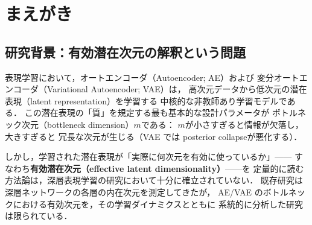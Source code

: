 \documentclass[11pt,a4paper]{jsarticle}
\newcommand{\mknee}{m^{\mathrm{knee}}}
\begin{document}
\begin{abstract}
\begin{enumerate}
        CIFAR-10 での拡張スイープ（実験 Exp-NatImg-Sweep，§\ref{sec:exp_natimg_sweep}）により，
        $m \in [32, 1024]$・$\beta_{\max} \in \{10,20,40,80\}$・デコーダ容量3水準で系統的に検索した結果，
        $\beta_{\max}=80$（薄型デコーダ）において$m=512$付近で AU 飽和プラトーの初観測に成功した
        （安定同定ではないが自然画像での飽和実現の最初の証拠）．
        また自然画像で「stable identification とみなせる条件」を5項目の判定基準として明文化し（§\ref{sec:natimg_stable_id}），
        $\mknee$検出法の比較実験（実験 Exp-NatImg-Knee，§\ref{sec:exp_natimg_knee}）により
        自然画像での最適検出法を特定した．
\end{enumerate}

本論文の方法論的貢献は，「各指標が何に対して頑健で，何に対して探索的か」を
実証的かつ理論的に明確化した点にあり，AE/VAE の設計・診断のための
実用的な多指標解釈ガイドラインを確立する．
\end{abstract}

\section{まえがき}\label{sec:intro}

\subsection{研究背景：有効潜在次元の解釈という問題}\label{sec:intro_bg}

表現学習において，オートエンコーダ（Autoencoder; AE）および
変分オートエンコーダ（Variational Autoencoder; VAE）\cite{kingma2014vae}は，
高次元データから低次元の潜在表現（latent representation）を学習する
中核的な非教師あり学習モデルである\cite{bengio2013representation}．
この潜在表現の「質」を規定する最も基本的な設計パラメータが
ボトルネック次元（bottleneck dimension）$m$である：
$m$が小さすぎると情報が欠落し，大きすぎると
冗長な次元が生じる（VAE では posterior collapse\cite{lucas2019elbo}が悪化する）．

しかし，学習された潜在表現が「実際に何次元を有効に使っているか」——
すなわち\textbf{有効潜在次元（effective latent dimensionality）}——を
定量的に読む方法論は，深層表現学習の研究において十分に確立されていない．
既存研究\cite{ansuini2019intrinsic,valeriani2023geometry}は
深層ネットワークの各層の内在次元を測定してきたが，
AE/VAE のボトルネックにおける有効次元を，その学習ダイナミクスとともに
系統的に分析した研究は限られている．
\end{document}

